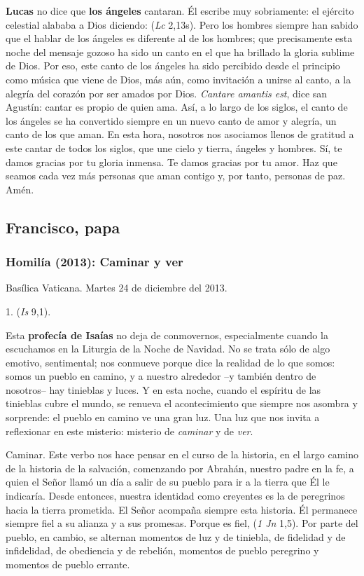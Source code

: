 \begin{body}
\begin{body}
\textbf{Lucas} no dice que \textbf{los ángeles} cantaran. Él escribe muy sobriamente: el ejército celestial alababa a Dios diciendo:  (\emph{Lc} 2,13s). Pero los hombres siempre han sabido que el hablar de los ángeles es diferente al de los hombres; que precisamente esta noche del mensaje gozoso ha sido un canto en el que ha brillado la gloria sublime de Dios. Por eso, este canto de los ángeles ha sido percibido desde el principio como música que viene de Dios, más aún, como invitación a unirse al canto, a la alegría del corazón por ser amados por Dios. \emph{Cantare amantis est}, dice san Agustín: cantar es propio de quien ama. Así, a lo largo de los siglos, el canto de los ángeles se ha convertido siempre en un nuevo canto de amor y alegría, un canto de los que aman. En esta hora, nosotros nos asociamos llenos de gratitud a este cantar de todos los siglos, que une cielo y tierra, ángeles y hombres. Sí, te damos gracias por tu gloria inmensa. Te damos gracias por tu amor. Haz que seamos cada vez más personas que aman contigo y, por tanto, personas de paz. Amén.

\subsection{Francisco, papa}

\subsubsection{Homilía (2013): Caminar y ver}

Basílica Vaticana. Martes 24 de diciembre del 2013.

1.  (\emph{Is} 9,1).

Esta \textbf{profecía de Isaías} no deja de conmovernos, especialmente cuando la escuchamos en la Liturgia de la Noche de Navidad. No se trata sólo de algo emotivo, sentimental; nos conmueve porque dice la realidad de lo que somos: somos un pueblo en camino, y a nuestro alrededor --y también dentro de nosotros-- hay tinieblas y luces. Y en esta noche, cuando el espíritu de las tinieblas cubre el mundo, se renueva el acontecimiento que siempre nos asombra y sorprende: el pueblo en camino ve una gran luz. Una luz que nos invita a reflexionar en este misterio: misterio de \emph{caminar} y de \emph{ver}.

Caminar. Este verbo nos hace pensar en el curso de la historia, en el largo camino de la historia de la salvación, comenzando por Abrahán, nuestro padre en la fe, a quien el Señor llamó un día a salir de su pueblo para ir a la tierra que Él le indicaría. Desde entonces, nuestra identidad como creyentes es la de peregrinos hacia la tierra prometida. El Señor acompaña siempre esta historia. Él permanece siempre fiel a su alianza y a sus promesas. Porque es fiel,  (\emph{1 Jn} 1,5). Por parte del pueblo, en cambio, se alternan momentos de luz y de tiniebla, de fidelidad y de infidelidad, de obediencia y de rebelión, momentos de pueblo peregrino y momentos de pueblo errante.


\end{body}
\end{body}
